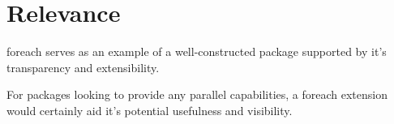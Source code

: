 \documentclass[a4paper,10pt]{article}
\begin{document}
\section{Relevance}
\label{sec:relevance}

foreach serves as an example of a well-constructed package supported
by it's transparency and extensibility.

For packages looking to provide any parallel capabilities, a foreach
extension would certainly aid it's potential usefulness and
visibility.

\printbibliography{}
\end{document}
